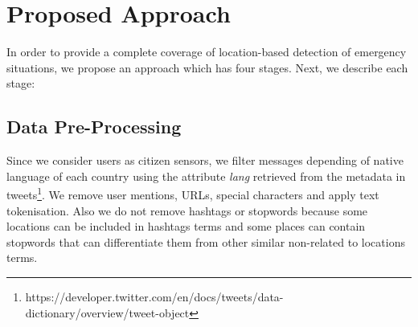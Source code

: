 \documentclass{llncs}
\begin{document}



\section{Proposed Approach}

In order to provide a complete coverage of location-based detection of emergency situations, we propose an approach which has four stages. Next, we describe each stage:


\subsection{Data Pre-Processing}

Since we consider users as citizen sensors, we filter messages depending of native language of each country using the attribute \textit{lang} retrieved from the metadata in tweets\footnote{https://developer.twitter.com/en/docs/tweets/data-dictionary/overview/tweet-object}. We remove user mentions, URLs,  special characters and apply text tokenisation. Also we do not remove hashtags or stopwords because some locations can be included in hashtags terms and some places can contain stopwords that can differentiate them from other similar non-related to locations terms.
\end{document}
